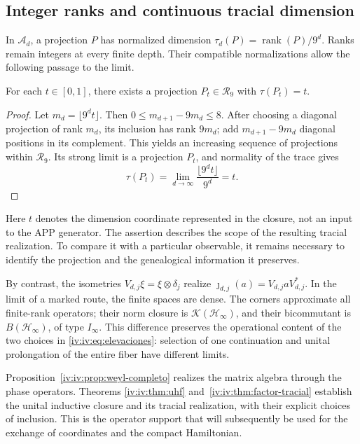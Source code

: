 \subsection{Integer ranks and continuous tracial dimension}

In \(\mathcal A_d\), a projection \(P\) has normalized
dimension \(\tau_d(P)=\operatorname{rank}(P)/9^d\).
Ranks remain integers at every finite depth. Their
compatible normalizations allow the following passage to the limit.

\begin{proposition}
\label{iv:iv:prop:dimension-tracial}
For each \(t\in[0,1]\), there exists a projection
\(P_t\in\mathcal R_9\) with \(\tau(P_t)=t\).
\end{proposition}
\begin{proof}
Let \(m_d=\lfloor9^dt\rfloor\). Then
\(0\leq m_{d+1}-9m_d\leq8\). After choosing a diagonal projection
of rank \(m_d\), its inclusion has rank \(9m_d\);
add \(m_{d+1}-9m_d\) diagonal positions in its complement.
This yields an increasing sequence of projections within
\(\mathcal R_9\). Its strong limit is a projection \(P_t\),
and normality of the trace gives
\[
 \tau(P_t)=\lim_{d\to\infty}\frac{\lfloor9^dt\rfloor}{9^d}=t.
\]
\end{proof}

Here \(t\) denotes the dimension coordinate represented
in the closure, not an input to the APP generator. The assertion
describes the scope of the resulting tracial realization. To
compare it with a particular observable, it remains necessary to
identify the projection and the genealogical information it preserves.

By contrast, the isometries
\(V_{d,j}\xi=\xi\otimes\delta_j\) realize
\(\jmath_{d,j}(a)=V_{d,j}aV_{d,j}^*\). In the limit of a
marked route, the finite spaces are dense. The corners
approximate all finite-rank operators; their norm closure
is \(\mathcal K(\mathcal H_\infty)\), and their bicommutant is
\(B(\mathcal H_\infty)\), of type \(I_\infty\). This
difference preserves the operational content of the two choices
in \eqref{iv:iv:eq:elevaciones}: selection of one continuation and
unital prolongation of the entire fiber have different limits.

Proposition~\ref{iv:iv:prop:weyl-completo} realizes the matrix
algebra through the phase operators. Theorems
\ref{iv:iv:thm:uhf} and~\ref{iv:iv:thm:factor-tracial} establish the unital
inductive closure and its tracial realization, with their explicit choices
of inclusion. This is the operator support that will subsequently be used
for the exchange of coordinates and the compact Hamiltonian.

